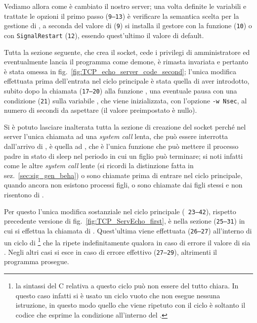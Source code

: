 Vediamo allora come è cambiato il nostro server; una volta definite le
variabili e trattate le opzioni il primo passo (\texttt{\small 9--13}) è
verificare la semantica scelta per la gestione di , a seconda
del valore di  (\texttt{\small 9}) si installa il gestore con la
funzione  (\texttt{\small 10}) o con \texttt{SignalRestart}
(\texttt{\small 12}), essendo quest'ultimo il valore di default.

Tutta la sezione seguente, che crea il socket, cede i privilegi di
amministratore ed eventualmente lancia il programma come demone, è rimasta
invariata e pertanto è stata omessa in
fig.~\ref{fig:TCP_echo_server_code_second}; l'unica modifica effettuata prima
dell'entrata nel ciclo principale è stata quella di aver introdotto, subito
dopo la chiamata (\texttt{\small 17--20}) alla funzione , una
eventuale pausa con una condizione (\texttt{\small 21}) sulla variabile
, che viene inizializzata, con l'opzione \texttt{-w Nsec}, al
numero di secondi da aspettare (il valore preimpostato è nullo).

Si è potuto lasciare inalterata tutta la sezione di creazione del socket
perché nel server l'unica chiamata ad una \textit{system call} lenta, che può
essere interrotta dall'arrivo di , è quella ad ,
che è l'unica funzione che può mettere il processo padre in stato di sleep nel
periodo in cui un figlio può terminare; si noti infatti come le altre
\textit{system call} lente (si ricordi la distinzione fatta in
sez.~\ref{sec:sig_gen_beha}) o sono chiamate prima di entrare nel ciclo
principale, quando ancora non esistono processi figli, o sono chiamate dai
figli stessi e non risentono di .

Per questo l'unica modifica sostanziale nel ciclo principale (\texttt{\small
  23--42}), rispetto precedente versione di fig.~\ref{fig:TCP_ServEcho_first},
è nella sezione (\texttt{\small 25--31}) in cui si effettua la chiamata di
.  Quest'ultima viene effettuata (\texttt{\small 26--27})
all'interno di un ciclo di \footnote{la sintassi del C relativa a
  questo ciclo può non essere del tutto chiara. In questo caso infatti si è
  usato un ciclo vuoto che non esegue nessuna istruzione, in questo modo
  quello che viene ripetuto con il ciclo è soltanto il codice che esprime la
  condizione all'interno del .}  che la ripete indefinitamente
qualora in caso di errore il valore di  sia . Negli
altri casi si esce in caso di errore effettivo (\texttt{\small 27--29}),
altrimenti il programma prosegue.

